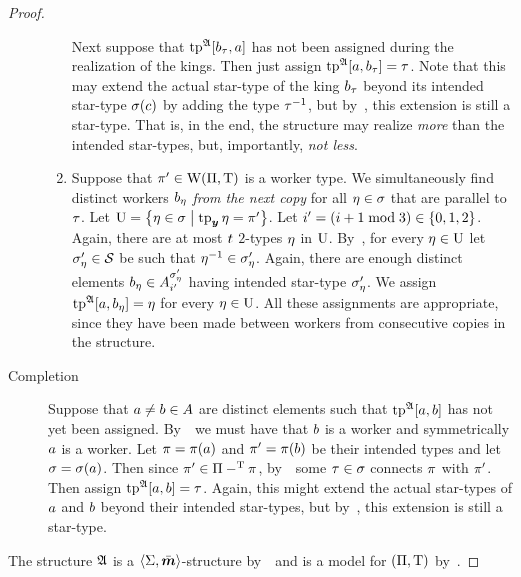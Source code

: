 \begin{proof}
\begin{description}
\begin{enumerate}
    Next suppose that $\operatorname{tp}^{\mathfrak{A}}[b_{\tau},a]$ has not been assigned during
    the realization of the kings.
    Then just assign $\operatorname{tp}^{\mathfrak{A}}[a,b_{\tau}] = \tau$.
    Note that this may extend the actual star-type of the king $b_{\tau}$ beyond its
    intended star-type $\sigma(c)$ by adding the type $\tau^{-1}$, but
    by~, this extension is still a star-type. That is,
    in the end, the structure may realize \emph{more} than the intended
    star-types, but, importantly, \emph{not less}.
    \item 
    Suppose that ${\pi'} \in \mathrm{W}(\Pi,\mathrm{T})$ is a worker type.
    We simultaneously find distinct workers $b_{\eta}$ \emph{from the next
    copy} for all $\eta \in \sigma$ that are parallel to $\tau$.
    Let $\mathrm{U} = \left\{\eta \in \sigma\mathrel{}\middle|\mathrel{}\operatorname{tp}_{\bm{y}}\eta = {\pi'}\right\}$.
    Let ${i'} = (i+1 \bmod 3) \in \left\{0,1,2\right\}$.
    Again, there are at most $t$ $2$-types $\eta$ in $\mathrm{U}$.
    By~, for every $\eta \in \mathrm{U}$ let $\sigma'_\eta \in \mathcal{S}$
    be such that $\eta^{-1} \in \sigma'_\eta$.
    Again, there are enough distinct elements $b_{\eta} \in
    A^{{\sigma_{\eta}'}}_{{i'}}$ having intended star-type ${\sigma_{\eta}'}$.
    We assign $\operatorname{tp}^{\mathfrak{A}}[a,b_{\eta}] = \eta$ for every $\eta \in \mathrm{U}$.
    All these assignments are appropriate, since they have been made between
    workers from consecutive copies in the structure.
  \end{enumerate}
  \item[Completion]
  Suppose that $a \neq b \in A$ are distinct elements such that
  $\operatorname{tp}^{\mathfrak{A}}[a,b]$ has not yet been assigned. By~~we must have
  that $b$ is a worker and symmetrically $a$ is a worker.
  Let $\pi = \pi(a)$ and ${\pi'} = \pi(b)$ be their intended types and
  let $\sigma = \sigma(a)$. Then since ${\pi'} \in \Pi -^{\mathrm{T}} \pi$,
  by~~some $\tau \in \sigma$ connects $\pi$ with ${\pi'}$. Then
  assign $\operatorname{tp}^{\mathfrak{A}}[a,b] = \tau$. Again, this might extend the actual
  star-types of $a$ and $b$ beyond their intended star-types, but
  by~, this extension is still a star-type.
\end{description}
The structure $\mathfrak{A}$ is a $\left\langle \mathrm{\Sigma},\bar{\bm{m}} \right\rangle$-structure by~~and is a
model for $(\Pi,\mathrm{T})$ by~.
\end{proof}

